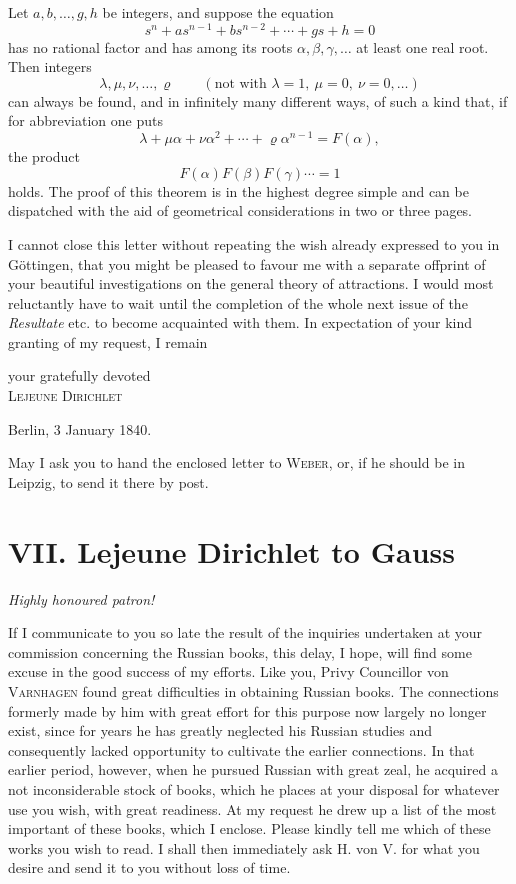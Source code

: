 \documentclass[11pt]{article}
\newcommand{\scn}[1]{\textsc{#1}}
\begin{document}
Let $a,b,\ldots,g,h$ be integers, and suppose the equation
\[
 s^n+as^{n-1}+bs^{n-2}+\cdots+gs+h=0
\]
has no rational factor and has among its roots $\alpha,\beta,\gamma,
\ldots$ at least one real root. Then integers
\[
 \lambda,\mu,\nu,\ldots,\varrho\qquad(\text{not with }\lambda=1,\ \mu=0,\ \nu=0,\ldots)
\]
can always be found, and in infinitely many different ways, of such a kind that, if for abbreviation one puts
\[
 \lambda+\mu\alpha+\nu\alpha^2+\cdots+\varrho\alpha^{n-1}=F(\alpha),
\]
the product
\[
 F(\alpha)F(\beta)F(\gamma)\cdots=1
\]
holds. The proof of this theorem is in the highest degree simple and can be dispatched with the aid of geometrical considerations in two or three pages.

I cannot close this letter without repeating the wish already expressed to you in Göttingen, that you might be pleased to favour me with a separate offprint of your beautiful investigations on the general theory of attractions. I would most reluctantly have to wait until the completion of the whole next issue of the \emph{Resultate} etc. to become acquainted with them. In expectation of your kind granting of my request, I remain

\begin{flushright}
your gratefully devoted\\
\scn{Lejeune Dirichlet}
\end{flushright}
Berlin, 3 January 1840.

May I ask you to hand the enclosed letter to \scn{Weber}, or, if he should be in Leipzig, to send it there by post.

\section*{VII. Lejeune Dirichlet to Gauss}
\begin{center}\emph{Highly honoured patron!}\end{center}

If I communicate to you so late the result of the inquiries undertaken at your commission concerning the Russian books, this delay, I hope, will find some excuse in the good success of my efforts. Like you, Privy Councillor von \scn{Varnhagen} found great difficulties in obtaining Russian books. The connections formerly made by him with great effort for this purpose now largely no longer exist, since for years he has greatly neglected his Russian studies and consequently lacked opportunity to cultivate the earlier connections. In that earlier period, however, when he pursued Russian with great zeal, he acquired a not inconsiderable stock of books, which he places at your disposal for whatever use you wish, with great readiness. At my request he drew up a list of the most important of these books, which I enclose. Please kindly tell me which of these works you wish to read. I shall then immediately ask H. von V. for what you desire and send it to you without loss of time.
\end{document}
